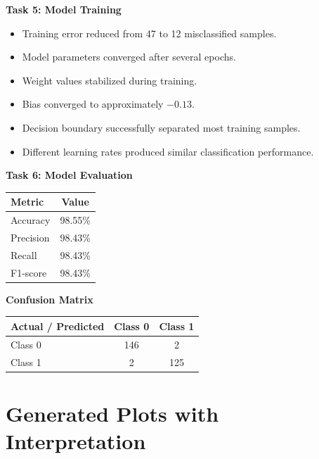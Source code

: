 \documentclass[11pt]{article}
\begin{document}
\vspace{2mm}

\textbf{Task 5: Model Training}

\begin{itemize}
\item Training error reduced from 47 to 12 misclassified samples.
\item Model parameters converged after several epochs.
\item Weight values stabilized during training.
\item Bias converged to approximately $-0.13$.
\item Decision boundary successfully separated most training samples.
\item Different learning rates produced similar classification performance.
\end{itemize}

\vspace{2mm}

\textbf{Task 6: Model Evaluation}

\begin{center}
\begin{tabular}{|l|c|}
\hline
\textbf{Metric} & \textbf{Value}\\
\hline
Accuracy & 98.55\%\\
\hline
Precision & 98.43\%\\
\hline
Recall & 98.43\%\\
\hline
F1-score & 98.43\%\\
\hline
\end{tabular}
\end{center}

\vspace{3mm}

\textbf{Confusion Matrix}

\begin{center}
\begin{tabular}{|l|c|c|}
\hline
\textbf{Actual / Predicted} & \textbf{Class 0} & \textbf{Class 1}\\
\hline
Class 0 & 146 & 2\\
\hline
Class 1 & 2 & 125\\
\hline
\end{tabular}
\end{center}

\section{Generated Plots with Interpretation}
\end{document}
